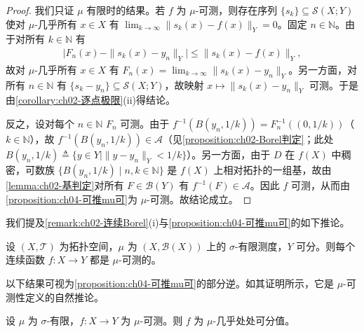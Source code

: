 \documentclass[../../main.tex]{subfiles}%
\begin{document}
\begin{proof}
我们只证 $\mu$ 有限时的结果。若 $f$ 为 $\mu$-可测，则存在序列 $\{s_k\}\subseteq\mathcal{S}(X;Y)$ 使对 $\mu$-几乎所有 $x\in X$ 有 $\lim_{k\to\infty}\|s_k(x)-f(x)\|_Y=0$。固定 $n\in\mathbb{N}$。由于对所有 $k\in\mathbb{N}$ 有
\begin{align*}
\big|F_n(x)-\|s_k(x)-y_n\|_Y\big|\leqslant\|s_k(x)-f(x)\|_Y,
\end{align*}
故对 $\mu$-几乎所有 $x\in X$ 有 $F_n(x)=\lim_{k\to\infty}\|s_k(x)-y_n\|_Y$。另一方面，对所有 $n\in\mathbb{N}$ 有 $\{s_k-y_n\}\subseteq\mathcal{S}(X;Y)$，故映射 $x\mapsto\|s_k(x)-y_n\|_Y$ 可测。于是由\cref{corollary:ch02-逐点极限}(ii)得结论。

反之，设对每个 $n\in\mathbb{N}$ $F_n$ 可测。由于 $f^{-1}(B(y_n,1/k))=F_n^{-1}((0,1/k))$（$k\in\mathbb{N}$），故 $f^{-1}(B(y_n,1/k))\in\mathcal{A}$（见\cref{proposition:ch02-Borel判定}；此处 $B(y_n,1/k)\triangleq \{y\in Y\mid\|y-y_n\|_Y<1/k\}$）。另一方面，由于 $D$ 在 $f(X)$ 中稠密，可数族 $\{B(y_n,1/k)\mid n,k\in\mathbb{N}\}$ 是 $f(X)$ 上相对拓扑的一组基，故由\cref{lemma:ch02-基判定}对所有 $F\in\mathcal{B}(Y)$ 有 $f^{-1}(F)\in\mathcal{A}$。因此 $f$ 可测，从而由\cref{proposition:ch04-可推mu可}为 $\mu$-可测。故结论成立。
\end{proof}

我们提及\cref{remark:ch02-连续Borel}(i)与\cref{proposition:ch04-可推mu可}的如下推论。

\begin{corollary}\label{corollary:ch04-连续可测}
设 $(X,\mathcal{T})$ 为拓扑空间，$\mu$ 为 $(X,\mathcal{B}(X))$ 上的 $\sigma$-有限测度，$Y$ 可分。则每个连续函数 $f:X\to Y$ 都是 $\mu$-可测的。
\end{corollary}

以下结果可视为\cref{proposition:ch04-可推mu可}的部分逆。如其证明所示，它是 $\mu$-可测性定义的自然推论。

\begin{proposition}\label{proposition:ch04-mu可推可分值}
设 $\mu$ 为 $\sigma$-有限，$f:X\to Y$ 为 $\mu$-可测。则 $f$ 为 $\mu$-几乎处处可分值。
\end{proposition}
\end{document}
